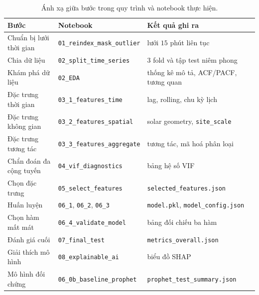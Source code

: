 \documentclass[12pt, a4paper]{report}
\begin{document}
\begin{table}[htbp]
\centering

\footnotesize
\renewcommand{\baselinestretch}{1.0}\selectfont
\begin{tabular}{@{}p{3.4cm} p{4.6cm} p{5.4cm}@{}}
\toprule
\textbf{Bước} & \textbf{Notebook} & \textbf{Kết quả ghi ra} \\
\midrule
Chuẩn bị lưới thời gian & \texttt{01\_reindex\_mask\_outlier} & lưới $15$ phút liên tục \\
Chia dữ liệu & \texttt{02\_split\_time\_series} & $3$ fold và tập test niêm phong \\
Khám phá dữ liệu & \texttt{02\_EDA} & thống kê mô tả, ACF/PACF, tương quan \\
Đặc trưng thời gian & \texttt{03\_1\_features\_time} & lag, rolling, chu kỳ lịch \\
Đặc trưng không gian & \texttt{03\_2\_features\_spatial} & solar geometry, \texttt{site\_scale} \\
Đặc trưng tương tác & \texttt{03\_3\_features\_aggregate} & tương tác, mã hoá phân loại \\
Chẩn đoán đa cộng tuyến & \texttt{04\_vif\_diagnostics} & bảng hệ số VIF \\
Chọn đặc trưng & \texttt{05\_select\_features} & \texttt{selected\_features.json} \\
Huấn luyện & \texttt{06\_1}, \texttt{06\_2}, \texttt{06\_3} & \texttt{model.pkl}, \texttt{model\_config.json} \\
Chọn hàm mất mát & \texttt{06\_4\_validate\_model} & bảng đối chiếu ba hàm \\
Đánh giá cuối & \texttt{07\_final\_test} & \texttt{metrics\_overall.json} \\
Giải thích mô hình & \texttt{08\_explainable\_ai} & biểu đồ SHAP \\
Mô hình đối chứng & \texttt{06\_0b\_baseline\_prophet} & \texttt{prophet\_test\_summary.json} \\
\bottomrule
\end{tabular}
\caption[Ánh xạ giữa bước trong quy trình và notebook thực hiện]{Ánh xạ giữa bước trong quy trình và notebook thực hiện.}
\label{tab:notebook_pipeline}
\end{table}
\end{document}
